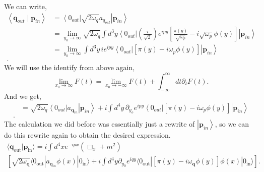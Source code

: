 \documentclass[working, oneside]{../../Preambles/tuftebook}
\begin{document}
\begin{solution}
We can write,
\begin{align*}
    \left<\mathbf{q}_{out} \mid \mathbf{p}_{in} \right> &= \left<0_{out} \right|\sqrt{2 \omega_{q}} a_{q_{out}} \left|\mathbf{p}_{in} \right> \\
    &= \lim_{y_0 \to \infty} \sqrt{2\omega_q} \int d^{3}y \left< 0_{out} \right| \left( \frac{i}{\sqrt{2} } \right) e^{ipy} \left[ \frac{\pi\left( y \right) }{\sqrt{\omega_p} } - i\sqrt{\omega_p} \phi \left( y \right)  \right] \left|\mathbf{p}_{in} \right> \\
    &= \lim_{y_0 \to \infty}  \int d^{3}y\, i e^{ipy} \left< 0_{out} \right|  \left[ \pi\left( y \right)  - i\omega_p \phi \left( y \right)  \right] \left|\mathbf{p}_{in} \right> \\
.\end{align*}
We will use the identify from above again,
\[
\lim_{x_0 \to \infty} F\left( t \right) = \lim_{x_0 \to -\infty} F\left( t \right) + \int_{-\infty}^{\infty} dt \partial_t F\left( t \right) 
.\] 
And we get,
\begin{align*}
    &= \sqrt{2\omega_{q}} \left<0_{out} \right| a_{\mathbf{q}_{in}} \left|\mathbf{p}_{in} \right>+ i \int d^{4}y\, \partial_{y_{o}}e^{ipy} \left< 0_{out} \right|  \left[ \pi\left( y \right)  - i\omega_p \phi \left( y \right)  \right] \left|\mathbf{p}_{in} \right> \\
.\end{align*}
The calculation we did before was essentially just a rewrite of $\left|\mathbf{p}_{in} \right>$, so we can do this rewrite again to obtain the desired expression.
\begin{align*}
\langle \mathbf{q}_{\text{out}} | \mathbf{p}_{\text{in}} \rangle = i \int d^4x e^{-ipx} (\Box_x + m^2) \\ \left[ \sqrt{2 \omega_\mathbf{q}} \langle 0_{\text{out}} | a_{\mathbf{q}_{\text{in}}} \phi(x) | 0_{\text{in}} \rangle + i \int d^4y \partial_{y_0} e^{iqy} \langle 0_{\text{out}} | \left[ \pi(y) - i \omega_\mathbf{q} \phi(y) \right] \phi(x) | 0_{\text{in}} \rangle \right]
.\end{align*}
\end{solution}
\end{document}
